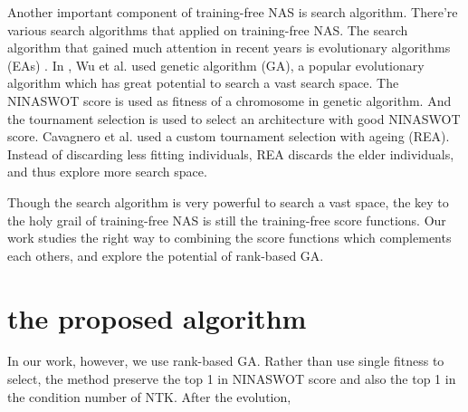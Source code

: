 \documentclass[sigconf]{acmart}
\begin{document}
    Another important component of training-free NAS is search algorithm. There're 
    various search algorithms that applied on training-free NAS. The search algorithm 
    that gained much attention in recent years is evolutionary algorithms (EAs) \cite{Liu_2023}.
    In \cite{10.1145/3491396.3506510}, Wu et al. used genetic algorithm (GA), a popular 
    evolutionary algorithm which has great potential to search a vast search space. 
    The NINASWOT score is used as fitness of a chromosome in genetic algorithm. And 
    the tournament selection is used to select an architecture with good NINASWOT score.
    Cavagnero et al. \cite{https://doi.org/10.48550/arxiv.2207.05135} used a custom 
	tournament selection with ageing (REA). Instead of discarding less fitting 
	individuals, REA discards the elder individuals, and thus explore more search 
	space. 
	
    Though the search algorithm is very powerful to search a vast space, the key to the holy 
    grail of training-free NAS is still the training-free score functions. Our work studies 
    the right way to combining the score functions which complements each others, and explore 
    the potential of rank-based GA.

    \section{the proposed algorithm}
    In our work, however, we use rank-based GA. Rather than use single fitness to select, 
    the method preserve the top 1 in NINASWOT score and also the top 1 in the condition 
    number of NTK. After the evolution, 

    
    
\end{document}
